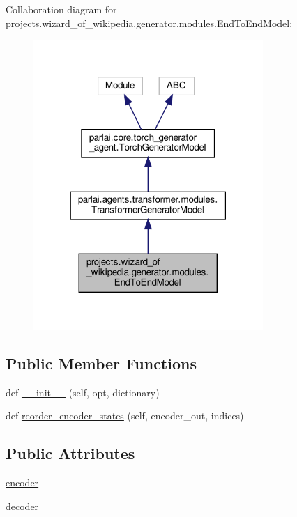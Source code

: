 Collaboration diagram for projects.\+wizard\+\_\+of\+\_\+wikipedia.\+generator.\+modules.\+End\+To\+End\+Model\+:
\nopagebreak
\begin{figure}[H]
\begin{center}
\leavevmode
\includegraphics[width=247pt]{da/d8e/classprojects_1_1wizard__of__wikipedia_1_1generator_1_1modules_1_1EndToEndModel__coll__graph}
\end{center}
\end{figure}
\subsection*{Public Member Functions}
\begin{DoxyCompactItemize}
\item 
def \hyperlink{classprojects_1_1wizard__of__wikipedia_1_1generator_1_1modules_1_1EndToEndModel_a247a986cf18f9711f93d2336d653779e}{\+\_\+\+\_\+init\+\_\+\+\_\+} (self, opt, dictionary)
\item 
def \hyperlink{classprojects_1_1wizard__of__wikipedia_1_1generator_1_1modules_1_1EndToEndModel_a619ee6377355376fd7fe43779dc54bea}{reorder\+\_\+encoder\+\_\+states} (self, encoder\+\_\+out, indices)
\end{DoxyCompactItemize}
\subsection*{Public Attributes}
\begin{DoxyCompactItemize}
\item 
\hyperlink{classprojects_1_1wizard__of__wikipedia_1_1generator_1_1modules_1_1EndToEndModel_a4d6ecf9a0df55b1124ffd4eec6bfb018}{encoder}
\item 
\hyperlink{classprojects_1_1wizard__of__wikipedia_1_1generator_1_1modules_1_1EndToEndModel_ab5c118e09c397fc75ccf49fb45119bd1}{decoder}
\end{DoxyCompactItemize}


